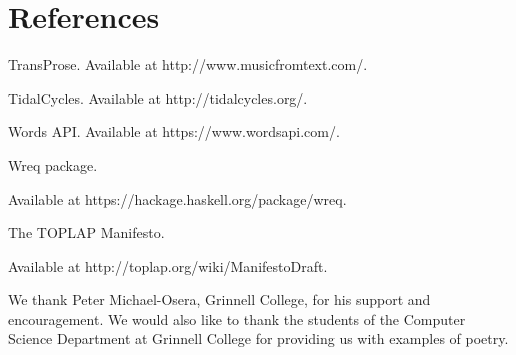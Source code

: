 \documentclass[11pt]{sigplanconf}
\begin{document}
\section{References}

TransProse. Available at http://www.musicfromtext.com/.

TidalCycles. Available at http://tidalcycles.org/.

Words API. Available at https://www.wordsapi.com/.

Wreq package.

Available at https://hackage.haskell.org/package/wreq.

The TOPLAP Manifesto.

Available at http://toplap.org/wiki/ManifestoDraft.

\acks
We thank Peter Michael-Osera, Grinnell College, for his support and encouragement. We would also like to thank the students of the Computer Science Department at Grinnell College for providing us with examples of poetry.
\end{document}
